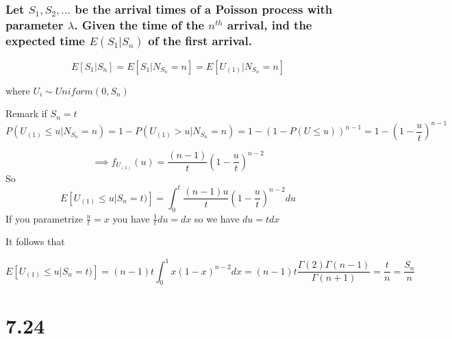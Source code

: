 \documentclass[]{article}
\begin{document}
\hypertarget{let-s_1-s_2-...-be-the-arrival-times-of-a-poisson-process-with-parameter-lambda.-given-the-time-of-the-nth-arrival-ind-the-expected-time-es_1s_n-of-the-first-arrival.}{%
\subsubsection{\texorpdfstring{Let \(S_1, S_2, ...\) be the arrival
times of a Poisson process with parameter \(\lambda\). Given the time of
the \(n^{th}\) arrival, ind the expected time \(E(S_1|S_n)\) of the
first
arrival.}{Let S\_1, S\_2, ... be the arrival times of a Poisson process with parameter \textbackslash{}lambda. Given the time of the n\^{}\{th\} arrival, ind the expected time E(S\_1\textbar{}S\_n) of the first arrival.}}\label{let-s_1-s_2-...-be-the-arrival-times-of-a-poisson-process-with-parameter-lambda.-given-the-time-of-the-nth-arrival-ind-the-expected-time-es_1s_n-of-the-first-arrival.}}

\[
E[S_1|S_n] = E[S_1 | N_{S_n} =n] = E[U_{(1)} | N_{S_n} = n]
\]

where \(U_i \sim Uniform(0, S_n)\)

Remark if \(S_n = t\) \[
P(U_{(1)} \leq u | N_{S_n} =n) = 1-P(U_{(1)} > u | N_{S_n} =n) = 1- (1-P(U \leq u))^{n-1} = 1 - (1 - \frac{u}{t})^{n-1}
\]

\[
\implies  f_{U_{(1)}}(u) =  \frac{(n-1)}{t}(1 - \frac{u}{t})^{n-2}
\] So \[
E[U_{(1)} \leq u | S_n = t)] = \int_{0}^t \frac{(n-1)u}{t}(1 - \frac{u}{t})^{n-2} du 
\] If you parametrize \(\frac{u}{t} = x\) you have
\(\frac{1}{t} du = dx\) so we have \(du = t dx\)

It follows that

\[
E[U_{(1)} \leq u | S_n = t)] = (n-1)t \int_{0}^1 x (1-x)^{n-2} dx = (n-1) t \frac{\Gamma(2)\Gamma(n-1)}{\Gamma(n+1)} = \frac{t}{n} = \frac{S_n}{n}
\]

\hypertarget{section-1}{%
\section{7.24}\label{section-1}}
\end{document}
